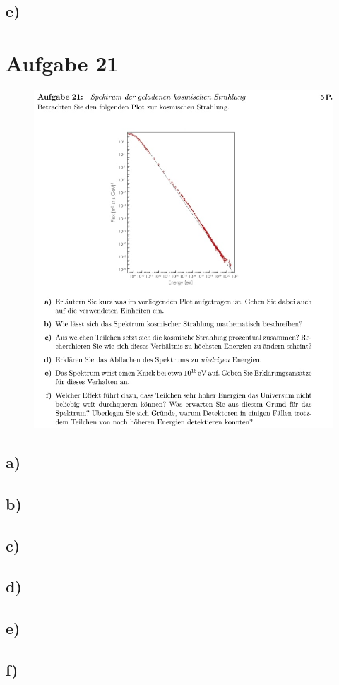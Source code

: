 \subsection{e)}

\section{Aufgabe 21}

    \begin{figure}[H]
        \centering
        \includegraphics[width=\textwidth]{images/Aufgabe21.jpg}
        \label{fig:4}
    \end{figure}


\subsection{a)}

\subsection{b)}

\subsection{c)}

\subsection{d)}

\subsection{e)}

\subsection{f)}





